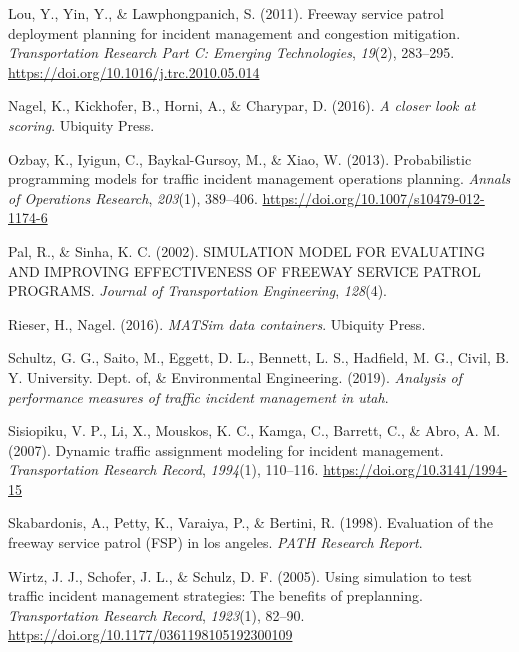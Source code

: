 \documentclass[fancy, oneside, mastersfancy, ms]{byuthesis}
\newlength{\cslhangindent}
\newlength{\cslentryspacingunit} %
\newenvironment{CSLReferences}[2] %
 {%
  \setlength{\parindent}{0pt}
  \ifodd #1
  \let\oldpar\par
  \def\par{\hangindent=\cslhangindent\oldpar}
  \fi
  \setlength{\parskip}{#2\cslentryspacingunit}
 }%
 {}
\begin{document}
\begin{CSLReferences}{1}{0}
\leavevmode{}%
Lou, Y., Yin, Y., \& Lawphongpanich, S. (2011). Freeway service patrol
deployment planning for incident management and congestion mitigation.
\emph{Transportation Research Part C: Emerging Technologies},
\emph{19}(2), 283--295. \url{https://doi.org/10.1016/j.trc.2010.05.014}

\leavevmode{}%
Nagel, K., Kickhofer, B., Horni, A., \& Charypar, D. (2016). \emph{A
closer look at scoring}. {Ubiquity Press}.

\leavevmode{}%
Ozbay, K., Iyigun, C., Baykal-Gursoy, M., \& Xiao, W. (2013).
Probabilistic programming models for traffic incident management
operations planning. \emph{Annals of Operations Research},
\emph{203}(1), 389--406. \url{https://doi.org/10.1007/s10479-012-1174-6}

\leavevmode{}%
Pal, R., \& Sinha, K. C. (2002). {SIMULATION MODEL FOR EVALUATING AND
IMPROVING EFFECTIVENESS OF FREEWAY SERVICE PATROL PROGRAMS}.
\emph{Journal of Transportation Engineering}, \emph{128}(4).

\leavevmode{}%
Rieser, H., Nagel. (2016). \emph{MATSim data containers}. {Ubiquity
Press}.

\leavevmode{}%
Schultz, G. G., Saito, M., Eggett, D. L., Bennett, L. S., Hadfield, M.
G., Civil, B. Y. University. Dept. of, \& Environmental Engineering.
(2019). \emph{Analysis of performance measures of traffic incident
management in utah}.

\leavevmode{}%
Sisiopiku, V. P., Li, X., Mouskos, K. C., Kamga, C., Barrett, C., \&
Abro, A. M. (2007). Dynamic traffic assignment modeling for incident
management. \emph{Transportation Research Record}, \emph{1994}(1),
110--116. \url{https://doi.org/10.3141/1994-15}

\leavevmode{}%
Skabardonis, A., Petty, K., Varaiya, P., \& Bertini, R. (1998).
Evaluation of the freeway service patrol ({FSP}) in los angeles.
\emph{PATH Research Report}.

\leavevmode{}%
Wirtz, J. J., Schofer, J. L., \& Schulz, D. F. (2005). Using simulation
to test traffic incident management strategies: {The} benefits of
preplanning. \emph{Transportation Research Record}, \emph{1923}(1),
82--90. \url{https://doi.org/10.1177/0361198105192300109}

\end{CSLReferences}
\end{document}
